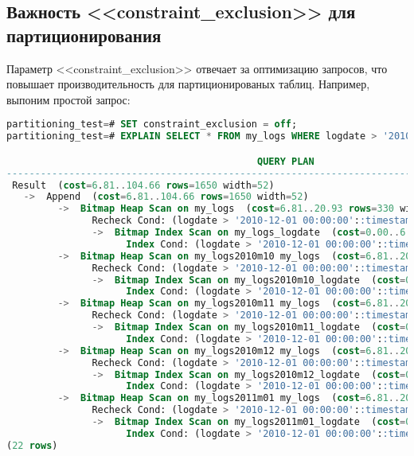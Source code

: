 \subsection{Важность <<constraint\_exclusion>> для партиционирования}
Параметр <<constraint\_exclusion>> отвечает за оптимизацию запросов, что повышает производительность для 
партиционированых таблиц. Например, выпоним простой запрос:
\begin{lstlisting}[language=SQL,label=lst:partitioning14,caption=<<constraint\_exclusion>> OFF]
partitioning_test=# SET constraint_exclusion = off;
partitioning_test=# EXPLAIN SELECT * FROM my_logs WHERE logdate > '2010-12-01';

                                            QUERY PLAN                                             
---------------------------------------------------------------------------------------------------
 Result  (cost=6.81..104.66 rows=1650 width=52)
   ->  Append  (cost=6.81..104.66 rows=1650 width=52)
         ->  Bitmap Heap Scan on my_logs  (cost=6.81..20.93 rows=330 width=52)
               Recheck Cond: (logdate > '2010-12-01 00:00:00'::timestamp without time zone)
               ->  Bitmap Index Scan on my_logs_logdate  (cost=0.00..6.73 rows=330 width=0)
                     Index Cond: (logdate > '2010-12-01 00:00:00'::timestamp without time zone)
         ->  Bitmap Heap Scan on my_logs2010m10 my_logs  (cost=6.81..20.93 rows=330 width=52)
               Recheck Cond: (logdate > '2010-12-01 00:00:00'::timestamp without time zone)
               ->  Bitmap Index Scan on my_logs2010m10_logdate  (cost=0.00..6.73 rows=330 width=0)
                     Index Cond: (logdate > '2010-12-01 00:00:00'::timestamp without time zone)
         ->  Bitmap Heap Scan on my_logs2010m11 my_logs  (cost=6.81..20.93 rows=330 width=52)
               Recheck Cond: (logdate > '2010-12-01 00:00:00'::timestamp without time zone)
               ->  Bitmap Index Scan on my_logs2010m11_logdate  (cost=0.00..6.73 rows=330 width=0)
                     Index Cond: (logdate > '2010-12-01 00:00:00'::timestamp without time zone)
         ->  Bitmap Heap Scan on my_logs2010m12 my_logs  (cost=6.81..20.93 rows=330 width=52)
               Recheck Cond: (logdate > '2010-12-01 00:00:00'::timestamp without time zone)
               ->  Bitmap Index Scan on my_logs2010m12_logdate  (cost=0.00..6.73 rows=330 width=0)
                     Index Cond: (logdate > '2010-12-01 00:00:00'::timestamp without time zone)
         ->  Bitmap Heap Scan on my_logs2011m01 my_logs  (cost=6.81..20.93 rows=330 width=52)
               Recheck Cond: (logdate > '2010-12-01 00:00:00'::timestamp without time zone)
               ->  Bitmap Index Scan on my_logs2011m01_logdate  (cost=0.00..6.73 rows=330 width=0)
                     Index Cond: (logdate > '2010-12-01 00:00:00'::timestamp without time zone)
(22 rows)
\end{lstlisting}

